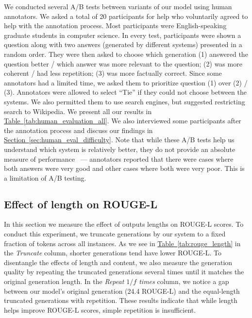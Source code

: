 \documentclass[11pt]{article}
\newcommand{\namedref}[2]{\hyperref[#2]{#1~\ref*{#2}}}
\newcommand{\sectionref}[1]{\namedref{Section}{#1}}
\newcommand{\tableref}[1]{\namedref{Table}{#1}}
\begin{document}
We conducted several A/B tests between variants of our model using human annotators. We asked a total of 20 participants for help who voluntarily agreed to help with the annotation process. Most participants were English-speaking graduate students in computer science. In every test, participants were shown a question along with two answers (generated by different systems) presented in a random order. They were then asked to choose which generation (1) answered the question better / which answer was more relevant to the question; (2) was more coherent / had less repetition; (3) was more factually correct. Since some annotators had a limited time, we asked them to prioritize question (1) over (2) / (3). Annotators were allowed to select ``Tie'' if they could not choose between the systems. We also permitted them to use search engines, but suggested restricting search to Wikipedia. We present all our results in \tableref{tab:human_evaluation_all}. We also interviewed some participants after the annotation process and discuss our findings in \sectionref{sec:human_eval_difficulty}. Note that while these A/B tests help us understand which system is relatively better, they do not provide an absolute measure of performance~\citep{celikyilmaz2020evaluation} --- annotators reported that there were cases where both answers were very good and other cases where both were very poor. This is a limitation of A/B testing.

\subsection{Effect of length on ROUGE-L}
\label{appendix:length_effect}

In this section we measure the effect of outputs lengths on ROUGE-L scores. To conduct this experiment, we truncate generations by our system to a fixed fraction of tokens across all instances. As we see in \tableref{tab:rouge_length} in the \emph{Truncate} column, shorter generations tend have lower ROUGE-L. To disentangle the effects of length and content, we also measure the generation quality by repeating the truncated generations several times until it matches the original generation length. In the \emph{Repeat $1/f$ times} column, we notice a gap between our model's original generation (24.4 ROUGE-L) and the equal-length truncated generations with repetition. These results indicate that while length helps improve ROUGE-L scores, simple repetition is insufficient.
\end{document}
